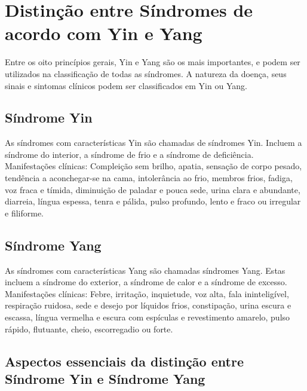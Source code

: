 \documentclass[12pt,oneside,a4paper]{book} %
\begin{document}
\chapter{Distinção entre Síndromes de acordo com Yin e Yang}

Entre os oito princípios gerais, Yin e Yang são os mais importantes, e podem ser utilizados na classificação de todas as síndromes. A natureza da doença, seus sinais e sintomas clínicos podem ser classificados em Yin ou Yang. 

\section{Síndrome Yin}
As síndromes com características Yin são chamadas de síndromes Yin. Incluem a síndrome do interior, a síndrome de frio e a síndrome de deficiência.
Manifestações clínicas: Compleição sem brilho, apatia, sensação de corpo pesado, tendência a aconchegar-se na cama, intolerância ao frio, membros frios, fadiga, voz fraca e tímida, diminuição de paladar e pouca sede, urina clara e abundante, diarreia, língua espessa, tenra e pálida, pulso profundo, lento e fraco ou irregular e filiforme.

\section{Síndrome Yang}
As síndromes com características Yang são chamadas síndromes Yang. Estas incluem a síndrome do exterior, a síndrome de calor e a síndrome de excesso.
Manifestações clínicas: Febre, irritação, inquietude, voz alta, fala ininteligível, respiração ruidosa, sede e desejo por líquidos frios, constipação, urina escura e escassa, língua vermelha e escura com espículas e revestimento amarelo, pulso rápido, flutuante, cheio, escorregadio ou forte.

\section{Aspectos essenciais da distinção entre Síndrome Yin e Síndrome Yang}
\end{document}
